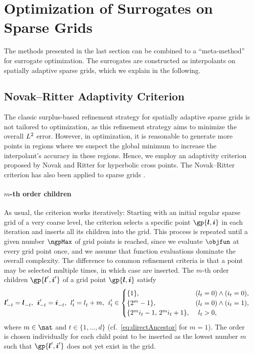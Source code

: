 \section{Optimization of Surrogates on Sparse Grids}
\label{sec:52method}


\noindent
The methods presented in the last section can be combined to a
``meta-method'' for surrogate optimization.
The surrogates are constructed as interpolants on spatially adaptive
sparse grids, which we explain in the following.



\subsection{Novak--Ritter Adaptivity Criterion}
\label{sec:521novakRitter}

The classic surplus-based refinement strategy for
spatially adaptive sparse grids is not tailored to optimization,
as this refinement strategy aims to minimize the overall $L^2$ error.
However, in optimization, it is reasonable to generate more
points in regions where we suspect the global minimum
to increase the interpolant's accuracy in these regions.
Hence, we employ an adaptivity criterion proposed by
Novak and Ritter \cite{Novak96Global} for hyperbolic cross points.
The Novak--Ritter criterion has also been applied to sparse grids
.

\paragraph{$m$-th order children}

As usual, the criterion works iteratively:
Starting with an initial regular sparse grid of a very coarse level,
the criterion selects a specific point $\gp{\*l,\*i}$ in each iteration
and inserts all its children into the grid.
This process is repeated until a given number $\ngpMax$ of grid points is
reached,
since we evaluate $\objfun$ at every grid point once, and we assume that
function evaluations dominate the overall complexity.
The difference to common refinement criteria is that
a point may be selected multiple times, in which case
 are inserted.
The $m$-th order children $\gp{\*l',\*i'}$ of a grid point $\gp{\*l,\*i}$
satisfy
\begin{equation}
  \label{eq:indirectChild}
  {\boldsymbol{l}}'_{-t} = {\boldsymbol{l}}^{}_{-t},\;\,
  {\boldsymbol{i}}'_{-t} = {\boldsymbol{i}}^{}_{-t},\;\,
  l'_t = l^{}_t + m,\;\,
  i'_t \in
  \begin{cases}
    \{1\},&(l_t = 0) \land (i_t = 0),\\
    \{2^m - 1\},&(l_t = 0) \land (i_t = 1),\\
    \{2^m i_t - 1,\, 2^m i_t + 1\},&\hphantom{(}l_t > 0,
  \end{cases}
\end{equation}
where $m \in \nat$ and $t \in \{1, \dotsc, d\}$
(cf.\ \cref{eq:directAncestor} for $m = 1$).
The order is chosen individually for each child point to be inserted
as the lowest number $m$ such that $\gp{\*l',\*i'}$ does not yet exist
in the grid.

